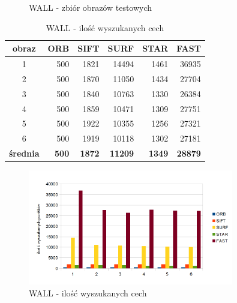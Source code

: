 \begin{figure}[!htb]
\begin{center}
{}
\caption{WALL - zbiór obrazów testowych}
\label{fig:wall_set}
\end{center}
\end{figure}


\begin{table}[htbp]
  \centering
  \caption{WALL - ilość wyszukanych cech}
    \begin{tabular}{|c|r|r|r|r|r|}\hline
    
    obraz & \textbf{ORB} & \textbf{SIFT} & \textbf{SURF} & \textbf{STAR} & \textbf{FAST} \\\hline
    
    1 & 500 & 1821 & 14494 & 1461 & 36935 \\
    2 & 500 & 1870 & 11050 & 1434 & 27704 \\
    3 & 500 & 1840 & 10763 & 1330 & 26384 \\
    4 & 500 & 1859 & 10471 & 1309 & 27751 \\
    5 & 500 & 1922 & 10355 & 1256 & 27321 \\
    6 & 500 & 1919 & 10118 & 1302 & 27181 \\\hline
    \textbf{średnia} & \textbf{500} & \textbf{1872} & \textbf{11209} & \textbf{1349} & \textbf{28879} \\
    \hline
    \end{tabular}%
  \label{tab:wall_f1}%
\end{table}%


\begin{figure}
\centering
\includegraphics[width=0.8\textwidth]{pict/mikolajczyk/wall/F1.png}
\caption{WALL - ilość wyszukanych cech}
\label{fig:wall_f1}
\end{figure}


